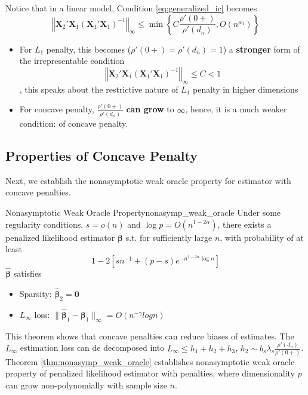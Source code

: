 \documentclass[twoside]{article}
\begin{document}
Notice that in a linear model, Condition \ref{eq:generalized_ic} becomes 
$$
\left\Vert \mathbf{X}_2' \mathbf{X}_1 \left(\mathbf{X}_1'\mathbf{X}_1\right)^{-1} \right\Vert _{\infty} \leq \min \left\{ C\frac{\rho'(0+)}{\rho'(d_n)}, O(n^{\alpha_1})\right\}
$$
\begin{itemize}
    \item For $L_1$ penalty, this becomes ($\rho'(0+)=\rho'(d_n)=1$) a \textbf{stronger} form of the irrepresentable condition $$ \left\Vert \mathbf{X}_2' \mathbf{X}_1 \left(\mathbf{X}_1'\mathbf{X}_1\right)^{-1} \right\Vert _{\infty} \leq C <1 $$, this speaks about the restrictive nature of $L_1$ penalty in higher dimensions
    \item For concave penalty, $\frac{\rho'(0+)}{\rho'(d_n)}$ \textbf{can grow} to $\infty$, hence, it is a much weaker condition:  of concave penalty.
\end{itemize}

\subsection{Properties of Concave Penalty}
Next, we establish the nonasymptotic weak oracle property for estimator with concave penalties.
\begin{theorem}{Nonasymptotic Weak Oracle Property}{nonasymp_weak_oracle}
    Under some regularity conditions, $s=o(n)$ and $\log p=O(n^{1-2\alpha})$, there exists a penalized likelihood estimator $\boldsymbol{\beta}$ s.t. for sufficiently large $n$, with probability of at least $$ 1-2\left[ sn^{-1}+(p-s)e^{-n^{1-2\alpha}\log n} \right] $$ $\hat{\boldsymbol{\beta}}$ satisfies 
    \begin{itemize}
        \item Sparsity: $\hat{\boldsymbol{\beta}}_2 =\mathbf{0}$
        \item $L_{\infty}$ loss: $\lVert \hat{\boldsymbol{\beta}}_1 -\boldsymbol{\beta}_1 \rVert _{\infty} = O(n^{-\gamma}log n)$
    \end{itemize}
\end{theorem}
This theorem shows that concave penalties can reduce biases of estimates. The $L_{\infty}$ estimation loss can de decomposed into $L_{\infty}\leq h_1 + h_2 + h_3$, $h_2 \sim b_s \lambda_s \frac{\rho'(d_n)}{\rho'(0+)}$. Theorem \ref{thm:nonasymp_weak_oracle} establishes nonasymptotic weak oracle property of penalized likelihood estimator with penalties, where dimensionality $p$ can grow non-polynomially with sample size $n$.
\end{document}
